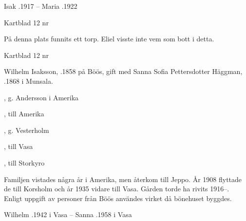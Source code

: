 Isak .1917  --  Maria .1922


Kartblad 12   nr 

På denna plats funnits ett torp. Eliel visste inte vem som bott i detta.


Kartblad 12   nr 

Wilhelm Isaksson, .1858 på Böös, gift med Sanna Sofia Pettersdotter Häggman, .1868 i Munsala.
\begin{jhchildren}
  \item {}, g. Andersson i Amerika
  \item {}, till Amerika
  \item {}
  \item {}, g. Vesterholm
  \item {}, till Vasa
  \item {}, till Storkyro
\end{jhchildren}
Familjen vistades några år i Amerika, men återkom till Jeppo. År 1908 flyttade de till Korsholm och år 1935 vidare till Vasa. Gården torde ha rivits 1916--. Enligt uppgift av personer från Böös användes virket då bönehuset byggdes.

Wilhelm .1942 i Vasa  --  Sanna .1958 i Vasa


